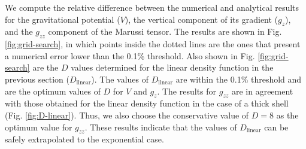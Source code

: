 \documentclass[extra, referee]{gji}
\begin{document}
We compute the relative difference between the numerical and analytical results for the
gravitational potential ($V$), the vertical component of its gradient ($g_z$), and the
$g_{zz}$ component of the Marussi tensor.
The results are shown in Fig. \ref{fig:grid-search}, in which points inside the dotted
lines are the ones that present a numerical error lower than the 0.1\% threshold.
Also shown in Fig. \ref{fig:grid-search} are the $D$ values determined for the linear
density function in the previous section ($D_\text{linear}$).
The values of $D_\text{linear}$ are within the 0.1\% threshold and are the optimum
values of $D$ for $V$ and $g_z$.
The results for $g_{zz}$ are in agreement with those obtained for the linear density
function in the case of a thick shell (Fig. \ref{fig:D-linear}).
Thus, we also choose the conservative value of $D=8$ as the optimum value for $g_{zz}$.
These results indicate that the values of $D_\text{linear}$ can be safely extrapolated
to the exponential case.
\end{document}
